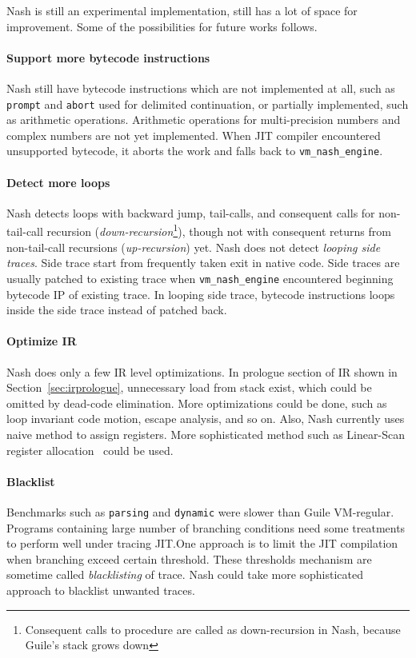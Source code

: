 \documentclass[preprint, 10pt]{sigplanconf}
\begin{document}
Nash is still an experimental implementation, still has a lot of space for
improvement. Some of the possibilities for future works follows.

\paragraph{Support more bytecode instructions} Nash still have bytecode
instructions which are not implemented at all, such as \texttt{prompt} and
\texttt{abort} used for delimited continuation, or partially implemented, such
as arithmetic operations. Arithmetic operations for multi-precision numbers and
complex numbers are not yet implemented. When JIT compiler encountered
unsupported bytecode, it aborts the work and falls back to
\texttt{vm\_nash\_engine}.

\paragraph{Detect more loops} Nash detects loops with backward jump,
tail-calls, and consequent calls for non-tail-call recursion
(\textit{down-recursion}\footnote{Consequent calls to procedure are called as
  down-recursion in Nash, because Guile's stack grows down}), though not with
consequent returns from non-tail-call recursions (\textit{up-recursion})
yet. Nash does not detect \textit{looping side traces}. Side trace start from
frequently taken exit in native code. Side traces are usually patched to
existing trace when \texttt{vm\_nash\_engine} encountered beginning bytecode IP
of existing trace. In looping side trace, bytecode instructions loops inside the
side trace instead of patched back.

\paragraph{Optimize IR} Nash does only a few IR level
optimizations. In prologue section of IR shown in
Section~\hyperref[sec:irprologue]{\ref{sec:irprologue}}, unnecessary load from
stack exist, which could be omitted by dead-code elimination. More optimizations
could be done, such as loop invariant code motion, escape analysis, and so
on. Also, Nash currently uses naive method to assign registers. More
sophisticated method such as Linear-Scan register
allocation~\cite{poletto1999linear} could be used.

\paragraph{Blacklist} Benchmarks such as \texttt{parsing} and
\texttt{dynamic} were slower than Guile VM-regular. Programs containing large
number of branching conditions need some treatments to perform well under
tracing JIT.\@ One approach is to limit the JIT compilation when branching
exceed certain threshold. These thresholds mechanism are sometime called
\textit{blacklisting} of trace. Nash could take more sophisticated approach to
blacklist unwanted traces.
\end{document}
